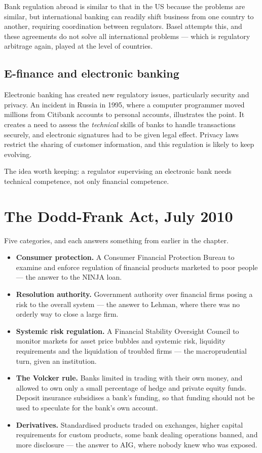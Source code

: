 \documentclass[11pt,a4paper]{article}
\begin{document}
Bank regulation abroad is similar to that in the US because the problems are
similar, but international banking can readily shift business from one country
to another, requiring coordination between regulators. Basel attempts this, and
these agreements do not solve all international problems --- which is regulatory
arbitrage again, played at the level of countries.

\subsection*{E-finance and electronic banking}

Electronic banking has created new regulatory issues, particularly security and
privacy. An incident in Russia in 1995, where a computer programmer moved
millions from Citibank accounts to personal accounts, illustrates the point. It
creates a need to assess the \emph{technical} skills of banks to handle
transactions securely, and electronic signatures had to be given legal effect.
Privacy laws restrict the sharing of customer information, and this regulation
is likely to keep evolving.

The idea worth keeping: a regulator supervising an electronic bank needs
technical competence, not only financial competence.

\section{The Dodd-Frank Act, July 2010}

Five categories, and each answers something from earlier in the chapter.

\begin{itemize}
\item \textbf{Consumer protection.} A Consumer Financial Protection Bureau to
examine and enforce regulation of financial products marketed to poor people ---
the answer to the NINJA loan.
\item \textbf{Resolution authority.} Government authority over financial firms
posing a risk to the overall system --- the answer to Lehman, where there was no
orderly way to close a large firm.
\item \textbf{Systemic risk regulation.} A Financial Stability Oversight Council
to monitor markets for asset price bubbles and systemic risk, liquidity
requirements and the liquidation of troubled firms --- the macroprudential turn,
given an institution.
\item \textbf{The Volcker rule.} Banks limited in trading with their own money,
and allowed to own only a small percentage of hedge and private equity funds.
Deposit insurance subsidises a bank's funding, so that funding should not be
used to speculate for the bank's own account.
\item \textbf{Derivatives.} Standardised products traded on exchanges, higher
capital requirements for custom products, some bank dealing operations banned,
and more disclosure --- the answer to AIG, where nobody knew who was exposed.
\end{itemize}
\end{document}
